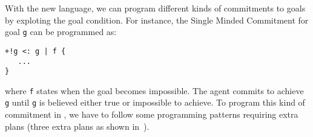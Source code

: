 With the new language, we can program different kinds of commitments
to goals~\cite{cohen:90,winikoff:02} by exploting the goal
condition. For instance, the Single Minded Commitment for goal
\texttt{g} can be programmed as:
\begin{small}
\begin{verbatim}
+!g <: g | f {
   ...
}
\end{verbatim}
\end{small}
where \texttt{f} states when the goal becomes impossible. The agent
commits to achieve \texttt{g} until \texttt{g} is believed either true
or impossible to achieve. To program this kind of commitment in \asl,
we have to follow some programming patterns requiring extra plans
(three extra plans as shown in~\cite{hubner:06b}).




